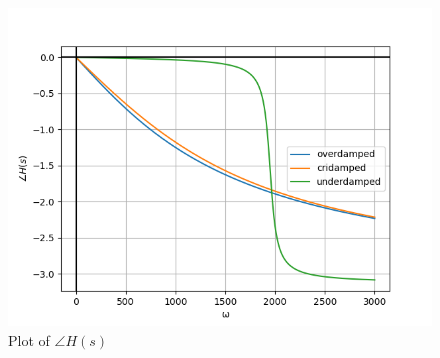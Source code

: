 \documentclass[journal,12pt,twocolumn]{IEEEtran}
\theoremstyle{remark}
\begin{document}
\begin{figure}[!ht]
    \centering
    \includegraphics[width=\columnwidth]{figs/angle_H_s.png}
    \caption{Plot of $\angle H(s)$}
\end{figure}
\end{document}
